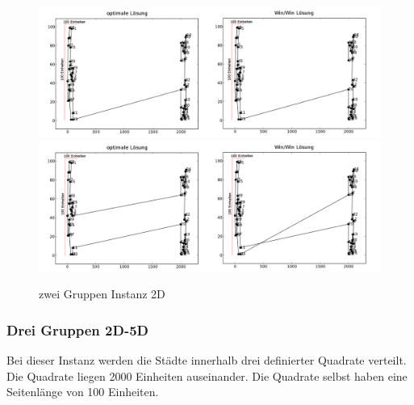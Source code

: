 \documentclass[11pt,a4paper]{article}
\begin{document}
\begin{figure}[H]
    \centering
    \includegraphics[width=16cm]{gfx/crowds2_hpp_comparison}
    \includegraphics[width=16cm]{gfx/crowds2_tsp_comparison}
    \caption{zwei Gruppen Instanz 2D}
    \label{img:crowds2_comparison}
\end{figure}

\subsubsection{Drei Gruppen 2D-5D}
Bei dieser Instanz werden die Städte innerhalb drei definierter Quadrate verteilt. Die Quadrate liegen 2000 Einheiten auseinander. Die Quadrate selbst haben eine Seitenlänge von 100 Einheiten.
\end{document}
